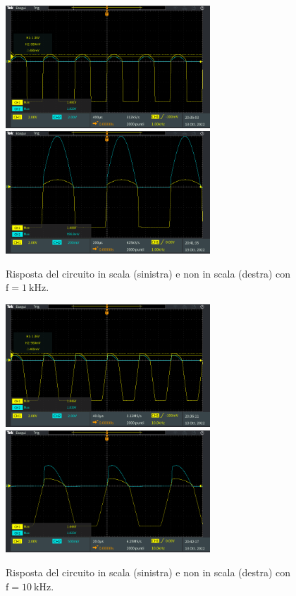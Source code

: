 \documentclass{report}
\begin{document}
\begin{figure}[h!]
\centering
\includegraphics[height=4.6cm]{immagini/TEK00017}
\includegraphics[height=4.6cm]{immagini/TEK00019}
\caption{Risposta del circuito in scala (sinistra) e non in scala (destra) con $\mathrm{f= \SI{1}{k\hertz}}$.}
	\label{figura:1khz}
\end{figure}\begin{figure}[h!]
\centering
\includegraphics[height=4.6cm]{immagini/TEK00018}
\includegraphics[height=4.6cm]{immagini/TEK00020}
\caption{Risposta del circuito in scala (sinistra) e non in scala (destra) con $\mathrm{f= \SI{10}{k\hertz}}$.}
	\label{figura:10khz}
\end{figure}
\end{document}
